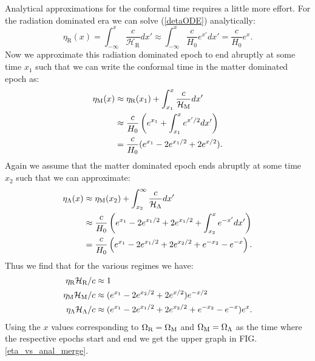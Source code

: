 \documentclass[%
reprint,
 amsmath,amssymb,
 aps,
]{revtex4-2}
\newcommand{\Hp}{\mathcal{H}}
\begin{document}
Analytical approximations for the conformal time requires a little more effort. For the radiation dominated era we can solve (\ref{detaODE}) analytically:
\[\eta_\text{R}(x)=\int_{-\infty}^x\frac{c}{\Hp_\text{R}}dx'\approx\int_{-\infty}^x\frac{c}{H_0}e^{x'}dx'=\frac{c}{H_0}e^x.\]
Now we approximate this radiation dominated epoch to end abruptly at some time $x_1$ such that we can write the conformal time in the matter dominated epoch as:
\begin{align*}
	\eta_\text M(x)&\approx\eta_\text{R}(x_1)+\int_{x_1}^x\frac{c}{\Hp_\text M}dx'\\
	&\approx\frac{c}{H_0}\left(e^{x_1}+\int_{x_1}^xe^{x'/2}dx' \right)\\
	&=\frac{c}{H_0}(e^{x_1}-2e^{x_1/2}+2e^{x/2}).
\end{align*}
Again we assume that the matter dominated epoch ends abruptly at some time $x_2$ such that we can approximate:
\begin{align*}
	\eta_\Lambda(x)&\approx\eta_\text M(x_2)+\int_{x_2}^\infty\frac{c}{\Hp_\Lambda}dx'\\
	&\approx\frac{c}{H_0}\left(e^{x_1}-2e^{x_1/2}+2e^{x_1/2}+\int_{x_2}^x e^{-x'}dx' \right)\\
	&=\frac{c}{H_0}\left(e^{x_1}-2e^{x_1/2}+2e^{x_2/2}+e^{-x_2}-e^{-x} \right).
\end{align*}
Thus we find that for the various regimes we have:
\begin{align*}
	\eta_\text{R}\Hp_\text{R}/c&\approx1\\
	\eta_\text M\Hp_\text M/c&\approx(e^{x_1}-2e^{x_2/2}+2e^{x/2})e^{-x/2}\\
	\eta_\Lambda\Hp_\Lambda/c&\approx(e^{x_1}-2e^{x_1/2}+2e^{x_2/2}+e^{-x_2}-e^{-x})e^{x}.
\end{align*}
Using the $x$ values corresponding to $\Omega_{\text{R}}=\Omega_\text M$ and $\Omega_{\text M}=\Omega_\Lambda$ as the time where the respective epochs start and end we get the upper graph in FIG. \ref{eta_vs_anal_merge}.
\end{document}
